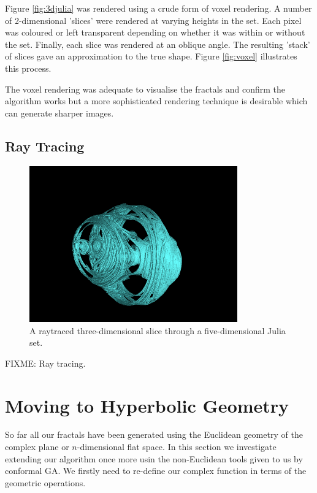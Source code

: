 Figure \ref{fig:3djulia} was rendered using a crude form of voxel rendering. A
number of 2-dimensional 'slices' were rendered at varying heights in the set. Each
pixel was coloured or left transparent depending on whether it was within or without
the set. Finally, each slice was rendered at an oblique angle. The resulting
'stack' of slices gave an approximation to the true shape. Figure
\ref{fig:voxel} illustrates this process.

The voxel rendering was adequate to visualise the fractals and confirm the algorithm
works but a more sophisticated rendering technique is desirable which can generate
sharper images.

\subsection{Ray Tracing}

\begin{figure}
\centering
\includegraphics[width=0.8\textwidth]{5djulia}
\caption{\label{fig:5djulia}
  A raytraced three-dimensional slice through a five-dimensional Julia set.
}
\end{figure}

FIXME: Ray tracing.

\section{Moving to Hyperbolic Geometry}

So far all our fractals have been generated using the Euclidean geometry of the complex plane
or $n$-dimensional flat space. In this section we investigate extending our algorithm once
more usin the non-Euclidean tools given to us by conformal GA. We firstly need to re-define 
our complex function in terms of the geometric operations.

